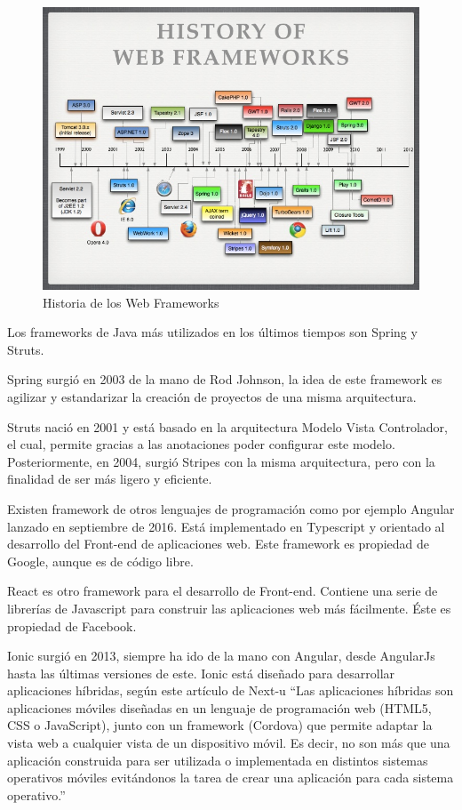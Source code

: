 \documentclass[12pt]{report} %
\begin{document}
  \begin{figure}
 	\centering
 	\includegraphics[width=0.7\linewidth]{imagenes/the-future-of-web-frameworks-11-728}
 	\caption{Historia de los Web Frameworks}
 	\label{fig:webFrameworks}
 \end{figure}

 Los frameworks de Java más utilizados en los últimos tiempos son Spring y Struts.
 
 Spring surgió en 2003 de la mano de Rod Johnson, la idea de este framework es agilizar y estandarizar la creación de proyectos de una misma arquitectura. 
 
 Struts nació en 2001 y está basado en la arquitectura Modelo Vista Controlador, el cual, permite gracias a las anotaciones poder configurar este modelo. Posteriormente, en 2004, surgió Stripes con la misma arquitectura, pero con la finalidad de ser más ligero y eficiente.
 
 Existen framework de otros lenguajes de programación como por ejemplo Angular lanzado en septiembre de 2016. Está implementado en Typescript y orientado al desarrollo del Front-end de aplicaciones web. Este framework es propiedad de Google, aunque es de código libre.
 
 React es otro framework para el desarrollo de Front-end. Contiene una serie de librerías de Javascript para construir las aplicaciones web más fácilmente. Éste es propiedad de Facebook.
 
 Ionic surgió en 2013, siempre ha ido de la mano con Angular, desde AngularJs hasta las últimas versiones de este. Ionic está diseñado para desarrollar aplicaciones híbridas, según este artículo de Next-u \cite{AppHibridas} “Las aplicaciones híbridas son aplicaciones móviles diseñadas en un lenguaje de programación web (HTML5, CSS o JavaScript), junto con un framework (Cordova) que permite adaptar la vista web a cualquier vista de un dispositivo móvil. Es decir, no son más que una aplicación construida para ser utilizada o implementada en distintos sistemas operativos móviles evitándonos la tarea de crear una aplicación para cada sistema operativo.”
 
\end{document}
